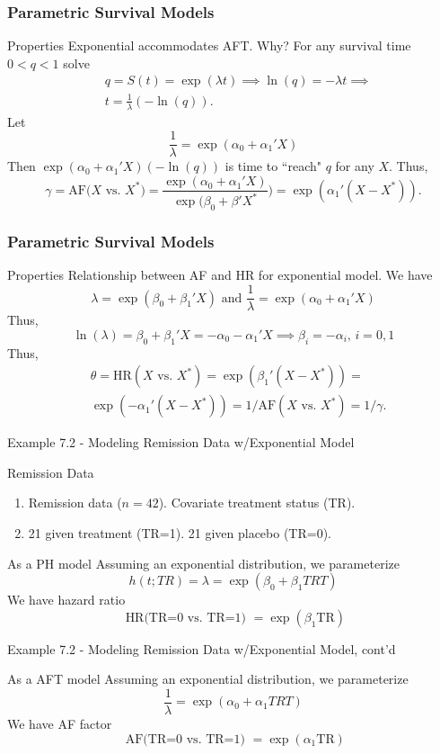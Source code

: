 \documentclass{beamer}
\theoremstyle{definition}
\begin{document}
\begin{frame}
\frametitle{Parametric Survival Models} 
\begin{block}{Properties} 
Exponential accommodates AFT. Why? For any survival time $0 < q < 1$ solve
\begin{align*}
& q = S(t) = \exp(\lambda t) \implies \ln(q) = - \lambda t \implies \\
& t = \frac{1}{\lambda} (- \ln(q)).
\end{align*}
Let
\[
\frac{1}{\lambda} = \exp(\alpha_0 + \alpha_1'X)
\]
Then $\exp(\alpha_0 + \alpha_1'X)(- \ln(q))$ is time to ``reach" $q$ for any $X$. Thus, 
\vspace{-10pt} 
\[
\gamma = \text{AF($X$ vs. $X^*$)} = \frac{\exp(\alpha_0 + \alpha_1'X)}{\exp(\beta_0 + \beta'X^*}) = \exp(\alpha_1'(X-X^*)).
\]
\end{block}
\end{frame} 


\begin{frame}
\frametitle{Parametric Survival Models}
\begin{block}{Properties}
Relationship between AF and HR for exponential model. We have
\[
\lambda = \exp(\beta_0 + \beta_1'X) \text{ and } \frac{1}{\lambda} = \exp(\alpha_0 + \alpha_1'X)
\]
Thus,
\[ \ln(\lambda) = \beta_0 + \beta_1'X = -\alpha_0 - \alpha_1'X \implies \beta_i = -\alpha_i, \, i=0,1 \]
Thus,
\begin{align*}
&\theta = \text{HR}(X \text{ vs. } X^*) = \exp(\beta_1'(X - X^*)) =\\
&\exp(-\alpha_1'(X - X^*)) = 1/\text{AF}(X \text{ vs. } X^*) = 1/\gamma.
\end{align*}
\end{block}
\end{frame}

\begin{frame}{Example 7.2 - Modeling Remission Data w/Exponential Model}
\begin{block}{Remission Data}
\begin{enumerate}[ ]
\item Remission data ($n=42$). Covariate treatment status (TR).
\item 21 given treatment (TR=1). 21 given placebo (TR=0).
\end{enumerate}
\end{block}
\begin{block}{As a PH model}
Assuming an exponential distribution, we parameterize
\[ h(t;TR)= \lambda = \exp(\beta_0 + \beta_1 TRT)
\]
We have hazard ratio
\[
\text{ HR(TR=0 vs. TR=1) } = \exp(\beta_1 \text{TR})
\]
 \end{block}
 \end{frame}
 
\begin{frame}{Example 7.2 - Modeling Remission Data w/Exponential Model, cont'd}
\begin{block}{As a AFT model}
Assuming an exponential distribution, we parameterize
\[ \frac{1}{\lambda} = \exp(\alpha_0 + \alpha_1 TRT)
\]
We have AF factor
\[
\text{ AF(TR=0 vs. TR=1) } = \exp(\alpha_1 \text{TR})
\]
 \end{block}
 \end{frame}
\end{document}
